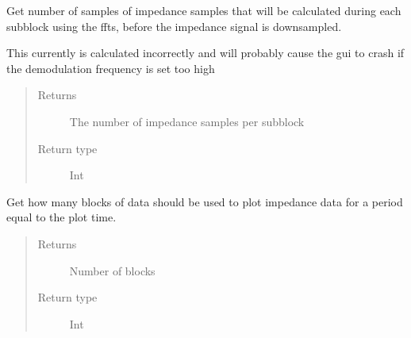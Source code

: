 \documentclass[letterpaper,10pt,english]{sphinxmanual}
\begin{document}
\begin{fulllineitems}
\begin{fulllineitems}
\end{fulllineitems}


\begin{fulllineitems}
\label{\detokenize{index:TiePieLCR_settings.TiePieLCR_settings.get_output_sub_block_size}}
\sphinxAtStartPar
Get number of samples of impedance samples that will be calculated during each sub\sphinxhyphen{}block using the ffts, before the impedance signal is downsampled.

\sphinxAtStartPar
This currently is calculated incorrectly and will probably cause the gui to crash if the demodulation frequency is set too high
\begin{quote}\begin{description}
\item[{Returns}] \leavevmode
\sphinxAtStartPar
The number of impedance samples per sub\sphinxhyphen{}block

\item[{Return type}] \leavevmode
\sphinxAtStartPar
Int

\end{description}\end{quote}

\end{fulllineitems}


\begin{fulllineitems}
\label{\detokenize{index:TiePieLCR_settings.TiePieLCR_settings.get_plot_blocks}}
\sphinxAtStartPar
Get how many blocks of data should be used to plot impedance data for a period equal to the plot time.
\begin{quote}\begin{description}
\item[{Returns}] \leavevmode
\sphinxAtStartPar
Number of blocks

\item[{Return type}] \leavevmode
\sphinxAtStartPar
Int

\end{description}\end{quote}


\end{fulllineitems}
\end{fulllineitems}
\end{document}

